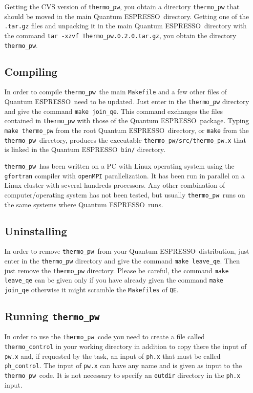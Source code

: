 \documentclass[12pt,a4paper]{article}
\def\qe{{\sc Quantum ESPRESSO}}
\def\thermo{\texttt{thermo\_pw}}
\begin{document}
Getting the CVS version of \thermo, you obtain a directory \texttt{thermo\_pw}
that should be moved in the main \qe\ directory. Getting one of the
\texttt{.tar.gz} files and unpacking it in the main \qe\ directory
with the command \texttt{tar -xzvf Thermo\_pw.0.2.0.tar.gz}, you 
obtain the directory \texttt{thermo\_pw}.

\subsection{Compiling}

In order to compile \thermo\ the main \texttt{Makefile} and a few other
files of \qe\ need to be updated. Just enter in the \texttt{thermo\_pw}
directory and give the command \texttt{make join\_qe}. This command exchanges
the files contained in \texttt{thermo\_pw} with those of the \qe\ package.
Typing \texttt{make thermo\_pw} from the root \qe\ directory, or \texttt{make} 
from the \texttt{thermo\_pw}\ directory, produces the executable
\texttt{thermo\_pw/src/thermo\_pw.x} that is linked in the 
\qe\ \texttt{bin/} directory. 

\thermo\ has been written on a PC with Linux operating system using the
\texttt{gfortran} compiler with \texttt{openMPI} parallelization. It has
been run in parallel on a Linux cluster with several hundreds processors.
Any other combination of computer/operating system has not been tested, but 
usually \thermo\ runs on the same systems where \qe\ runs. 

\subsection{Uninstalling}

In order to remove \thermo\ from your \qe\ distribution, just enter in the
\texttt{thermo\_pw} directory and give the command \texttt{make leave\_qe}.
Then just remove the \texttt{thermo\_pw} directory. Please be careful, the
command \texttt{make leave\_qe} can be given only if you have already
given the command \texttt{make join\_qe} otherwise it might scramble the
\texttt{Makefiles} of \texttt{QE}.

\subsection{Running \thermo}

In order to use the \thermo\ code you need to create a file called
\texttt{thermo\_control} in your working directory in addition to copy
there the input of \texttt{pw.x} and, if requested by the task, an
input of \texttt{ph.x} that must be called \texttt{ph\_control}.
The input of \texttt{pw.x} can have any name and is given as input to
the \thermo\ code. It is not necessary to specify an \texttt{outdir} 
directory in the \texttt{ph.x} input.
\end{document}
